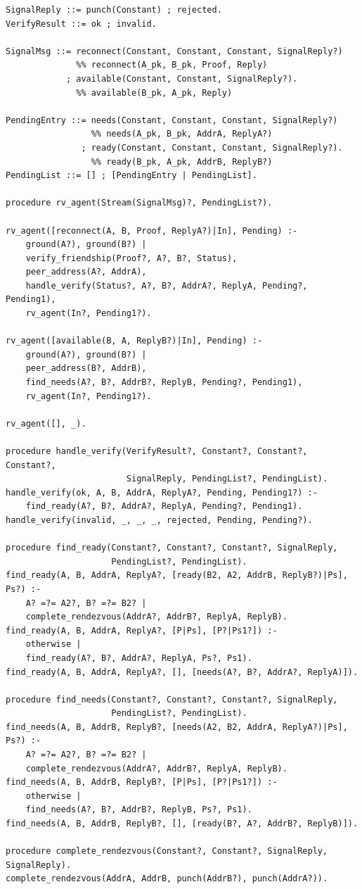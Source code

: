 \begin{verbatim}
SignalReply ::= punch(Constant) ; rejected.
VerifyResult ::= ok ; invalid.

SignalMsg ::= reconnect(Constant, Constant, Constant, SignalReply?)
              %% reconnect(A_pk, B_pk, Proof, Reply)
            ; available(Constant, Constant, SignalReply?).
              %% available(B_pk, A_pk, Reply)

PendingEntry ::= needs(Constant, Constant, Constant, SignalReply?)
                 %% needs(A_pk, B_pk, AddrA, ReplyA?)
               ; ready(Constant, Constant, Constant, SignalReply?).
                 %% ready(B_pk, A_pk, AddrB, ReplyB?)
PendingList ::= [] ; [PendingEntry | PendingList].

procedure rv_agent(Stream(SignalMsg)?, PendingList?).

rv_agent([reconnect(A, B, Proof, ReplyA?)|In], Pending) :-
    ground(A?), ground(B?) |
    verify_friendship(Proof?, A?, B?, Status),
    peer_address(A?, AddrA),
    handle_verify(Status?, A?, B?, AddrA?, ReplyA, Pending?, Pending1),
    rv_agent(In?, Pending1?).

rv_agent([available(B, A, ReplyB?)|In], Pending) :-
    ground(A?), ground(B?) |
    peer_address(B?, AddrB),
    find_needs(A?, B?, AddrB?, ReplyB, Pending?, Pending1),
    rv_agent(In?, Pending1?).

rv_agent([], _).

procedure handle_verify(VerifyResult?, Constant?, Constant?, Constant?,
                        SignalReply, PendingList?, PendingList).
handle_verify(ok, A, B, AddrA, ReplyA?, Pending, Pending1?) :-
    find_ready(A?, B?, AddrA?, ReplyA, Pending?, Pending1).
handle_verify(invalid, _, _, _, rejected, Pending, Pending?).

procedure find_ready(Constant?, Constant?, Constant?, SignalReply,
                     PendingList?, PendingList).
find_ready(A, B, AddrA, ReplyA?, [ready(B2, A2, AddrB, ReplyB?)|Ps], Ps?) :-
    A? =?= A2?, B? =?= B2? |
    complete_rendezvous(AddrA?, AddrB?, ReplyA, ReplyB).
find_ready(A, B, AddrA, ReplyA?, [P|Ps], [P?|Ps1?]) :-
    otherwise |
    find_ready(A?, B?, AddrA?, ReplyA, Ps?, Ps1).
find_ready(A, B, AddrA, ReplyA?, [], [needs(A?, B?, AddrA?, ReplyA)]).

procedure find_needs(Constant?, Constant?, Constant?, SignalReply,
                     PendingList?, PendingList).
find_needs(A, B, AddrB, ReplyB?, [needs(A2, B2, AddrA, ReplyA?)|Ps], Ps?) :-
    A? =?= A2?, B? =?= B2? |
    complete_rendezvous(AddrA?, AddrB?, ReplyA, ReplyB).
find_needs(A, B, AddrB, ReplyB?, [P|Ps], [P?|Ps1?]) :-
    otherwise |
    find_needs(A?, B?, AddrB?, ReplyB, Ps?, Ps1).
find_needs(A, B, AddrB, ReplyB?, [], [ready(B?, A?, AddrB?, ReplyB)]).

procedure complete_rendezvous(Constant?, Constant?, SignalReply, SignalReply).
complete_rendezvous(AddrA, AddrB, punch(AddrB?), punch(AddrA?)).
\end{verbatim}

